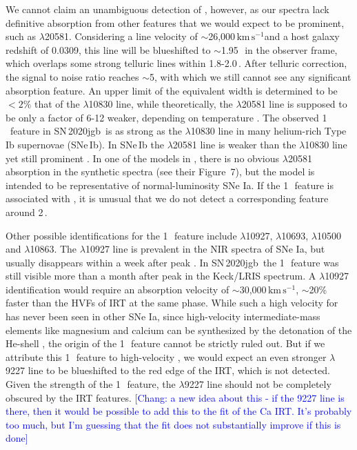 \documentclass[twocolumn]{aastex631}
\newcommand{\sn}{SN\,2020jgb}
\newcommand{\kms}{$\mathrm{km}\,\mathrm{s}^{-1}$}
\newcommand{\chang}[1]{\textcolor{blue}{[Chang: #1]}}
\begin{document}
We cannot claim an unambiguous detection of , however, as our spectra lack definitive absorption from other  features that we would expect to be prominent, such as  $\lambda$20581. Considering a line velocity of $\sim$26,000\,\kms and a host galaxy redshift of 0.0309, this line will be blueshifted to $\sim$1.95\,\micron\ in the observer frame, which overlaps some strong telluric lines within 1.8-2.0\,\micron. After telluric correction, the signal to noise ratio reaches $\sim$5, with which we still cannot see any significant absorption feature. An upper limit of the equivalent width is determined to be $<$$2\%$ that of the  $\lambda$10830 line, while theoretically, the $\lambda$20581 line is supposed to be only a factor of 6-12 weaker, depending on temperature \citep{Marion2009_NIR}. The observed 1\,\micron\ feature in \sn\ is as strong as the  $\lambda$10830 line in many helium-rich Type Ib supernovae (SNe\,Ib). In SNe\,Ib the  $\lambda$20581 line is weaker than the  $\lambda$10830 line yet still prominent \citep{CSP_Ibc_2022}. In one of the models in \citet{Boyle2017_Helium}, there is no obvious  $\lambda$20581 absorption in the synthetic spectra (see their Figure~7), but the model is intended to be representative of normal-luminosity SNe Ia. If the 1\,\micron\ feature is associated with , it is unusual that we do not detect a corresponding feature around 2\,\micron.

Other possible identifications for the 1\,\micron\ feature include  $\lambda$10927,  $\lambda$10693,  $\lambda$10500 and $\lambda$10863. The  $\lambda$10927 line is prevalent in the NIR spectra of SNe Ia, but usually disappears within a week after peak \citep{Marion2009_NIR}. In \sn\ the 1\,\micron\ feature was still visible more than a month after peak in the Keck/LRIS spectrum. A  $\lambda$10927 identification would require an absorption velocity of $\sim$30,000\,\kms, $\sim$20\% faster than the HVFs of  IRT at the same phase. While such a high velocity for  has never been seen in other SNe Ia, since high-velocity intermediate-mass elements like magnesium and calcium can be synthesized by the detonation of the He-shell \citep{Shen_DD_2014}, the  origin of the 1\,\micron\ feature cannot be strictly ruled out. But if we attribute this 1\,\micron\ feature to high-velocity , we would expect an even stronger  $\lambda$9227 line to be blueshifted to the red edge of the  IRT, which is not detected. Given the strength of the 1\,\micron\ feature, the  $\lambda$9227 line should not be completely obscured by the  IRT features. \chang{a new idea about this - if the 9227 line is there, then it would be possible to add this to the fit of the Ca IRT. It's probably too much, but I'm guessing that the fit does not substantially improve if this is done}
\end{document}

